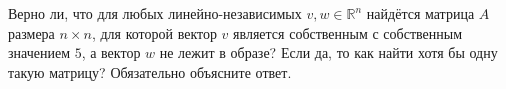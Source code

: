 \documentclass{article}
\begin{document}
Верно ли, что для любых линейно-независимых $v, w \in \mathbb{R}^n$ найдётся матрица $A$ размера $n \times n$, для которой вектор 
$v$ является собственным с собственным значением $5$, а вектор $w$ не лежит в образе? Если да, то как найти хотя бы одну такую матрицу?
Обязательно объясните ответ.
\end{document}

